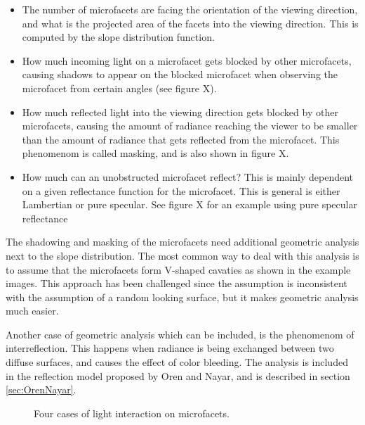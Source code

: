 \begin{itemize}
	\item{ The number of microfacets are facing the orientation of the viewing direction, and what is the projected area of the facets into the viewing direction. This is computed by the slope distribution function. }
	\item{ How much incoming light on a microfacet gets blocked by other microfacets, causing shadows to appear on the blocked microfacet when observing the microfacet from certain angles (see figure X).} 
	\item{ How much reflected light into the viewing direction gets blocked by other microfacets, causing the amount of radiance reaching the viewer to be smaller than the amount of radiance that gets reflected from the microfacet. This phenomenom is called masking, and is also shown in figure X. }
	\item{ How much can an unobstructed microfacet reflect? This is mainly dependent on a given reflectance function for the microfacet. This is general is either Lambertian or pure specular. See figure X for an example using pure specular reflectance}
\end{itemize}

The shadowing and masking of the microfacets need additional geometric analysis next to the slope distribution. The most common way to deal with this analysis is to assume that the microfacets form V-shaped cavaties as shown in the example images. This approach has been challenged since the assumption is inconsistent with the assumption of a random looking surface, but it makes geometric analysis much easier.

Another case of geometric analysis which can be included, is the phenomenom of interreflection. This happens when radiance is being exchanged between two diffuse surfaces, and causes the effect of color bleeding. The analysis is included in the reflection model proposed by Oren and Nayar, and is described in section \ref{sec:OrenNayar}.

\begin{figure}[H]
	\begin{center}
		\label{fig:GAFa}
		\label{fig:GAFb}
		\label{fig:GAFc}
		\label{fig:GAFd}
	\end{center}
	\caption{Four cases of light interaction on microfacets.}
	\label{fig:GAF}
\end{figure}


